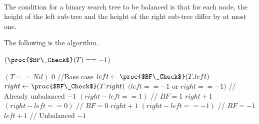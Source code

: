 \documentclass[11pt, answers]{exam}
\theoremstyle{plain}
\theoremstyle{definition}
\begin{document}
\begin{questions}
\begin{solution}
\begin{parts}
\begin{minipage}[t]{\linewidth}
\end{minipage}

\end{parts}

\end{solution}

\question
\begin{solution}

\end{solution}


\question
\begin{solution}\\
The condition for a binary search tree to be balanced is that for each node, the height of the left sub-tree and the height of the right sub-tree differ by at most one.

The following is the algorithm.

\begin{codebox}
\li \If $(\proc{$BF\_Check$}(T) == -1$)
\li     \Then \Return {}
\li \Else
\li     \Return {}
\end{codebox}

\begin{codebox}
\li \If $(T == Nil)$ 
\li     \Then \Return $0$ //Base case
\li \Else
\li     $left \gets \proc{$BF\_Check$}(T.left)$
\li     $right \gets \proc{$BF\_Check$}(T.right)$
\li     \If $(left == -1 $ or $ right == -1)$ // Already unbalanced
\li         \Then \Return $-1$ 
\li     \ElseIf $(right - left == 1)$       // $BF=1$
\li         \Then \Return $right+1$ 
\li     \ElseIf $(right - left == 0)$       // $BF=0$
\li         \Then \Return $right+1$ 
\li     \ElseIf $(right - left == -1)$      // $BF=-1$
\li         \Then \Return $left+1$ 
\li     \Else // Unbalanced
\li         \Return $-1$ \End \End
\end{codebox}


\end{solution}
\end{questions}
\end{document}
